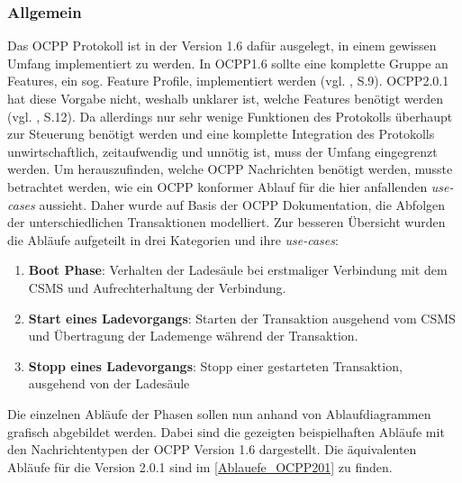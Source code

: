 \subsubsection{Allgemein}
Das OCPP Protokoll ist in der Version 1.6 dafür ausgelegt, in einem gewissen Umfang implementiert zu werden. In OCPP1.6 sollte eine komplette Gruppe an Features, ein sog. Feature Profile, implementiert werden (vgl. \cite{OCPP-1.6-edition-2}, S.9). OCPP2.0.1 hat diese Vorgabe nicht, weshalb unklarer ist, welche Features benötigt werden (vgl. \cite{OCPP-2.0.1-part0-introduction}, S.12). Da allerdings nur sehr wenige Funktionen des Protokolls überhaupt zur Steuerung benötigt werden und eine komplette Integration des Protokolls unwirtschaftlich, zeitaufwendig und unnötig ist, muss der Umfang eingegrenzt werden.  Um herauszufinden, welche OCPP Nachrichten benötigt werden, musste betrachtet werden, wie ein OCPP konformer Ablauf für die hier anfallenden \textit{use-cases} aussieht. Daher wurde auf Basis der OCPP Dokumentation, die Abfolgen der unterschiedlichen Transaktionen modelliert. 
\noindent Zur besseren Übersicht wurden die Abläufe aufgeteilt in drei Kategorien und ihre \textit{use-cases}: 
\begin{enumerate}
	\item \textbf{Boot Phase}: Verhalten der Ladesäule bei erstmaliger Verbindung mit dem \acs{CSMS} und Aufrechterhaltung der Verbindung.
	\item \textbf{Start eines Ladevorgangs}: Starten der Transaktion ausgehend vom \acs{CSMS} und Übertragung der Lademenge während der Transaktion.
	\item \textbf{Stopp eines Ladevorgangs}: Stopp einer gestarteten Transaktion, ausgehend von der Ladesäule
\end{enumerate}
Die einzelnen Abläufe der Phasen sollen nun anhand von Ablaufdiagrammen grafisch abgebildet werden.
Dabei sind die gezeigten beispielhaften Abläufe mit den Nachrichtentypen der OCPP Version 1.6 dargestellt. Die äquivalenten Abläufe für die Version 2.0.1 sind im \autoref{Ablauefe_OCPP201} zu finden.

